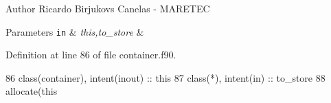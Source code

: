 \begin{DoxyAuthor}{Author}
Ricardo Birjukovs Canelas -\/ M\+A\+R\+E\+T\+EC 
\end{DoxyAuthor}

\begin{DoxyParams}[1]{Parameters}
\mbox{\tt in}  & {\em this,to\+\_\+store} & \\
\hline
\end{DoxyParams}


Definition at line 86 of file container.\+f90.


\begin{DoxyCode}
86     \textcolor{keywordtype}{class}(container), \textcolor{keywordtype}{intent(inout)} :: this
87     \textcolor{keywordtype}{class}(*), \textcolor{keywordtype}{intent(in)} :: to\_store
88     \textcolor{keyword}{allocate}(this%
\end{DoxyCode}
